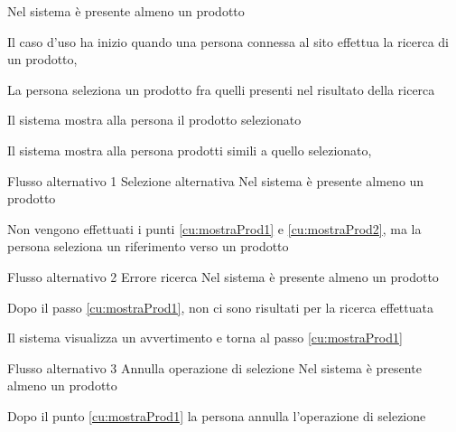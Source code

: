 {Nel sistema è presente almeno un prodotto}
{\postNulle}
{\begin{enumCU}
	\item Il caso d'uso ha inizio quando una persona connessa al sito effettua la ricerca di un prodotto, \label{cu:mostraProd1}
	\item La persona seleziona un prodotto fra quelli presenti nel risultato della ricerca\label{cu:mostraProd2}
	\item Il sistema mostra alla persona il prodotto selezionato
	\item Il sistema mostra alla persona prodotti simili a quello selezionato, 
\end{enumCU}}
%
{Flusso alternativo 1}%
{Selezione alternativa}%
{Nel sistema è presente almeno un prodotto}%
{\postNulle}%
{\begin{enumCU}
		\item Non vengono effettuati i punti \ref{cu:mostraProd1} e \ref{cu:mostraProd2}, ma la persona seleziona un \gls{riferimento} verso un prodotto
\end{enumCU}}%
%
{Flusso alternativo 2}%
{Errore ricerca}%
{Nel sistema è presente almeno un prodotto}%
{\postNulle}%
{\begin{enumCU}
		\item Dopo il passo \ref{cu:mostraProd1}, non ci sono risultati per la ricerca effettuata
		\item Il sistema visualizza un avvertimento e torna al passo \ref{cu:mostraProd1}
\end{enumCU}}%
%	
{Flusso alternativo 3}%
{Annulla operazione di selezione}%
{Nel sistema è presente almeno un prodotto}%
{\postNulle}%
{\begin{enumCU}
		\item Dopo il punto \ref{cu:mostraProd1} la persona annulla l'operazione di selezione
\end{enumCU}}%

\tabcuvspace

%


